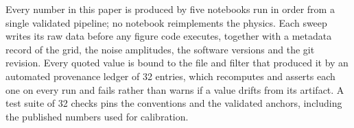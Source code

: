 \documentclass[journal]{IEEEtran}
\begin{document}
Every number in this paper is produced by five notebooks run in order from a single validated
pipeline; no notebook reimplements the physics. Each sweep writes its raw data before any
figure code executes, together with a metadata record of the grid, the noise amplitudes, the
software versions and the git revision. Every quoted value is bound to the file and filter
that produced it by an automated provenance ledger of 32 entries, which recomputes and asserts
each one on every run and fails rather than warns if a value drifts from its artifact. A test
suite of 32 checks pins the conventions and the validated anchors, including the published
numbers used for calibration.



\end{document}
